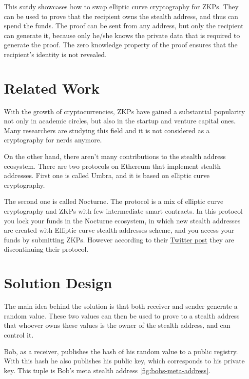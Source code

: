 \documentclass[conference,comsoc,10pt]{IEEEtran}
\begin{document}
        This sutdy showcases how to swap elliptic curve cryptography for ZKPs.
        They can be used to prove that the recipient owns the stealth address, and
        thus can spend the funds. The proof can be sent from any address, but only
        the recipient can generate it, because only he/she knows the private data
        that is required to generate the proof. The zero knowledge property of the
        proof ensures that the recipient's identity is not revealed.

    \section{Related Work}

        With the growth of cryptocurrencies, ZKPs have gained a substantial popularity
        not only in academic circles, but also in the startup and venture capital
        ones. Many researchers are studying this field and it is not considered 
        as a cryptography for nerds anymore.

        On the other hand, there aren't many contributions to the stealth address
        ecosystem. There are two protocols on Ethereum that implement stealth addresses.
        First one is called Umbra\cite{umbra}, and it is based on elliptic curve
        cryptography.

        The second one is called Nocturne\cite{nocturne}. The protocol is a mix of
        elliptic curve cryptography and ZKPs with few intermediate smart contracts.
        In this protocol you lock your funds in the Nocturne ecosystem, in which
        new stealth addresses are created with Elliptic curve stealth addresses scheme,
        and you access your funds by submitting ZKPs. However according to their
        \href{https://twitter.com/nocturne_xyz/status/1749510390906511693}{Twitter post}
        they are discontinuing their protocol.


\section{Solution Design}

    The main idea behind the solution is that both
    receiver and sender generate a random value. These two values can then
    be used to prove to a stealth address that whoever owns these values
    is the owner of the stealth address, and can control it.

    Bob, as a receiver, publishes the hash of his random value to a public
    registry. With this hash he also publishes his public key, which corresponds
    to his private key. This tuple is Bob's meta stealth address \ref{fig:bobs-meta-address}.
\end{document}
